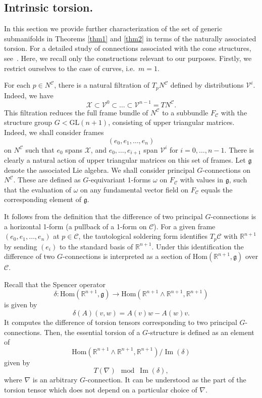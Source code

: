 \documentclass[11pt]{amsart}
\theoremstyle{definition}
\newcommand{\R}{\mathbb{R}}
\newcommand{\Hom}{\mathrm{Hom}}
\newcommand{\VV}{\mathcal{V}}
\newcommand{\XX}{\mathcal{X}}
\newcommand{\CC}{\mathcal{C}}
\begin{document}
\subsection{Intrinsic torsion.}
In this section we provide further characterization of the set of generic submanifolds in Theorems \ref{thm1} and \ref{thm2} in terms of the naturally associated torsion.
For a detailed study of connections associated with the cone structures, see~\cite{H3}. Here, we recall only the constructions relevant to our purposes.
Firstly, we restrict ourselves to the case of curves, i.e.~$m=1$.

For each $p \in N^\CC$, there is a natural filtration of $T_pN^\CC$ defined by distributions $\VV^i$. Indeed, we have
\[
\XX\subset\VV^0\subset\ldots\subset\VV^{n-1}=TN^\CC.
\]
This filtration reduces the full frame bundle of $N^\CC$ to a subbundle $F_\CC$ with the structure group $G < \mathrm{GL}(n+1)$, consisting of upper triangular matrices.  Indeed, we shall consider frames
\[
(e_0,e_1,\ldots,e_n)
\]
on $N^\CC$ such that $e_0$ spans $\XX$, and $e_0,\ldots,e_{i+1}$ span $\VV^i$ for $i=0,\ldots,n-1$. There is clearly a natural action of upper triangular matrices on this set of frames. Let $\mathfrak{g}$ denote the associated Lie algebra. We shall consider principal $G$-connections on $N^\CC$. These are defined as $G$-equivariant 1-forms $\omega$ on $F_\CC$ with values in $\mathfrak{g}$, such that the evaluation of $\omega$ on any fundamental vector field on $F_\CC$ equals the corresponding element of $\mathfrak{g}$.

It follows from the definition that the difference of two principal $G$-connections is a horizontal 1-form (a pullback of a 1-form on $\CC$). For a given frame $(e_0,e_1,\ldots,e_n)$ at $p\in\CC$, the tautological soldering form identifies $T_p\CC$ with $\R^{n+1}$ by sending $(e_i)$ to the standard basis of $\R^{n+1}$. Under this identification the difference of two $G$-connections is interpreted as a section of $\Hom(\R^{n+1},\mathfrak{g})$ over $\CC$.

Recall that the Spencer operator
\[
\delta\colon\Hom(\R^{n+1},\mathfrak{g})\to\Hom(\R^{n+1}\wedge\R^{n+1},\R^{n+1})
\]
is given by
\[
\delta(A)(v,w)=A(v)w-A(w)v.
\]
It computes the difference of torsion tensors corresponding to two principal $G$-connections. Then, the essential torsion of a $G$-structure is defined as an element of
\[
\Hom(\R^{n+1}\wedge\R^{n+1},\R^{n+1})/\operatorname{Im}(\delta)
\]
given by
\[
T(\nabla)\mod\operatorname{Im}(\delta),
\]
where $\nabla$ is an arbitrary $G$-connection. It can be understood as the part of the torsion tensor which does not depend on a particular choice of $\nabla$.
\end{document}
